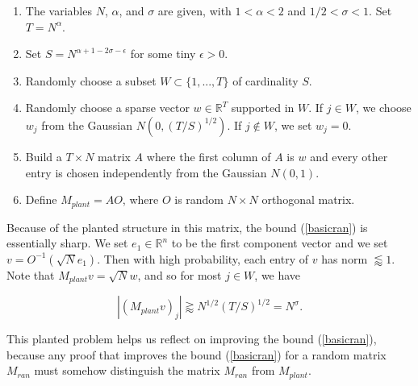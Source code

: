 \documentclass{amsart}
\newcommand{\RR}{\mathbb{R}}
\begin{document}
\begin{enumerate}

\item The variables $N$, $ \alpha$, and $\sigma$ are given,  with $1 < \alpha < 2$ and $1/2 < \sigma < 1$.   Set $T = N^\alpha$.  

\item Set $S = N^{\alpha + 1 - 2 \sigma - \epsilon}$ for some tiny $\epsilon > 0$.

\item Randomly choose a subset $W \subset \{1, ..., T \}$ of cardinality $S$.

\item Randomly choose a sparse vector $w \in \RR^T$ supported in $W$.   If $j \in W$,  we choose $w_j$ from the Gaussian $N(0,  (T/S)^{1/2})$.  If $j \notin W$,  we set $w_j = 0$.

\item Build a $T \times N$ matrix $A$ where the first column of $A$ is $w$ and every other entry is chosen independently from the Gaussian $N(0,1)$.

\item Define $M_{plant} = A O$,  where $O$ is  random $N \times N$ orthogonal matrix.

\end{enumerate}

Because of the planted structure in this matrix,  the bound (\ref{basicran}) is essentially sharp.   We set $e_1 \in \RR^n$ to be the first component vector and we set $v = O^{-1}( \sqrt{N} e_1 )$.   Then with high probability,  each entry of $v$ has norm $\lessapprox 1$.   Note that $M_{plant} v = \sqrt{N} w$,  and so for most $j \in W$,  we have

$$ | (M_{plant} v)_j | \gtrapprox N^{1/2} (T/S)^{1/2} = N^\sigma. $$

This planted problem helps us reflect on improving the bound (\ref{basicran}),  because any proof that improves the bound (\ref{basicran}) for a random matrix $M_{ran}$ must somehow distinguish the matrix $M_{ran}$ from $M_{plant}$. 
\end{document}
